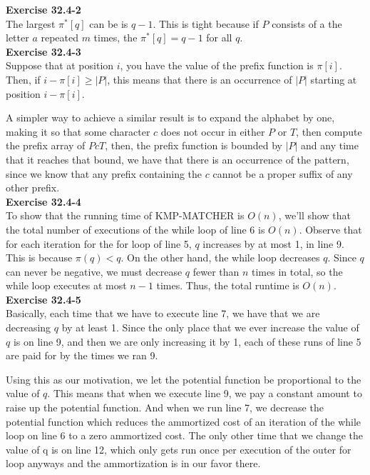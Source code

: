 \documentclass{article}
\begin{document}
\noindent\textbf{Exercise 32.4-2}\\

The largest $\pi^*[q]$ can be is $q-1$.  This is tight because if $P$ consists of a the letter $a$ repeated $m$ times, the $\pi^*[q] = q-1$ for all $q$. \\



\noindent\textbf{Exercise 32.4-3}\\

Suppose that at position $i$, you have the value of the prefix function is $\pi[i]$. Then, if $i-\pi[i] \ge|P| $, this means that there is an occurrence of $|P|$ starting at position $i-\pi[i]$. 

A simpler way to achieve a similar result is to expand the alphabet by one, making it so that some character $c$ does not occur in either $P$ or $T$, then compute the prefix array of $PcT$, then, the prefix function is bounded by $|P|$ and any time that it reaches that bound, we have that there is an occurrence of the pattern, since we know that any prefix containing the $c$ cannot be a proper suffix of any other prefix.\\

\noindent\textbf{Exercise 32.4-4}\\

To show that the running time of KMP-MATCHER is $O(n)$, we'll show that the total number of executions of the while loop of line 6 is $O(n)$.  Observe that for each iteration for the for loop of line 5, $q$ increases by at most 1, in line 9.  This is because $\pi(q) < q$.  On the other hand, the while loop decreases $q$.  Since $q$ can never be negative, we must decrease $q$ fewer than $n$ times in total, so the while loop executes at most $n-1$ times.  Thus, the total runtime is $O(n)$. \\


\noindent\textbf{Exercise 32.4-5}\\

Basically, each time that we have to execute line 7, we have that we are decreasing $q$ by at least 1. Since the only place that we ever increase the value of $q$ is on line 9, and then we are only increasing it by 1, each of these runs of line 5 are paid for by the times we ran 9.

Using this as our motivation, we let the potential function be proportional to the value of $q$. This means that when we execute line 9, we pay a constant amount to raise up the potential function. And when we run line 7, we decrease the potential function which reduces the ammortized cost of an iteration of the while loop on line 6 to a zero ammortized cost. The only other time that we change the value of q is on line 12, which only gets run once per execution of the outer for loop anyways and the ammortization is in our favor there.
\end{document}
